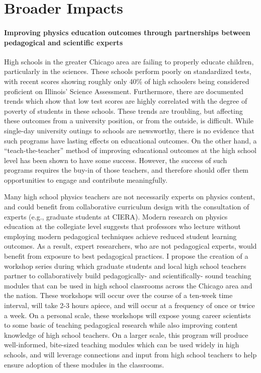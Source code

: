 \documentclass[11pt, preprint]{aastex}
\begin{document}
\section{Broader Impacts}
\label{sct:broader_impacts}

\paragraph{Improving physics education outcomes through partnerships between pedagogical and scientific experts}
High schools in the greater Chicago area are failing to properly educate children, particularly in the sciences.
These schools perform poorly on standardized tests, with recent scores showing roughly only 40\% of high schoolers being considered proficient on Illinois' Science Assessment.
Furthermore, there are documented trends which show that low test scores are highly correlated with the degree of poverty of students in these schools.
These trends are troubling, but affecting these outcomes from a university position, or from the outside, is difficult.
While single-day university outings to schools are newsworthy, there is no evidence that such programs have lasting effects on educational outcomes.
On the other hand, a ``teach-the-teacher'' method of improving educational outcomes at the high school level has been shown to have some success.
However, the success of such programs requires the buy-in of those teachers, and therefore should offer them opportunities to engage and contribute meaningfully.


Many high school physics teachers are not necessarily experts on physics content, and could benefit from collaborative curriculum design with the consultation of experts (e.g., graduate students at CIERA).
Modern research on physics education at the collegiate level suggests that professors who lecture without employing modern pedagogical techniques achieve reduced student learning outcomes.
As a result, expert researchers, who are not pedagogical experts, would benefit from exposure to best pedagogical practices.
I propose the creation of a workshop series during which graduate students and local high school teachers partner to collaboratively build pedagogically- and scientifically- sound teaching modules that can be used in high school classrooms across the Chicago area and the nation.
These workshops will occur over the course of a ten-week time interval, will take 2-3 hours apiece, and will occur at a frequency of once or twice a week.
On a personal scale, these workshops will expose young career scientists to some basic of teaching pedagogical research while also improving content knowledge of high school teachers.
On a larger scale, this program will produce well-informed, bite-sized teaching modules which can be used widely in high schools, and will leverage connections and input from high school teachers to help ensure adoption of these modules in the classrooms.
\end{document}
